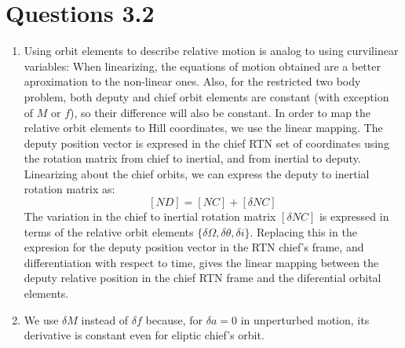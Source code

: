 \documentclass[a4paper]{article}
\begin{document}
\section{Questions 3.2}

\begin{enumerate}[label=\emph{\alph*)}]
  \item %
    Using orbit elements to describe relative motion is analog to using curvilinear variables: When linearizing, the equations of motion obtained are a better aproximation to the non-linear ones. Also, for the restricted two body problem, both deputy and chief orbit elements are constant (with exception of $M$ or $f$), so their difference will also be constant. In order to map the relative orbit elements to Hill coordinates, we use the linear mapping. The deputy position vector is expresed in the chief RTN set of coordinates using the rotation matrix from chief to inertial, and from inertial to deputy. Linearizing about the chief orbits, we can express the deputy to inertial rotation matrix as:\\
    \[[ND]=[NC]+[\delta NC]\]
    The variation in the chief to inertial rotation matrix $[\delta NC]$ is expressed in terms of the relative orbit elements $\{\delta\Omega,\delta\theta, \delta i\}$. Replacing this in the expresion for the deputy position vector in the RTN chief's frame, and differentiation with respect to time, gives the linear mapping between the deputy relative position in the chief RTN frame and the diferential orbital elements.

  \item %
    We use $\delta M$ instead of $\delta f$ because, for $\delta a = 0$ in unperturbed motion, its derivative is constant even for eliptic chief's orbit.
 

\end{enumerate}
\end{document}
